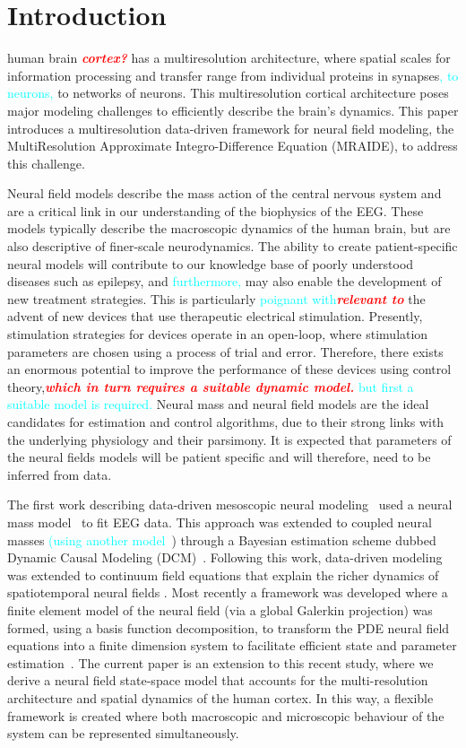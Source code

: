 \documentclass[journal]{IEEEtran}
\newcommand{\mike}[1]{\textsf{\emph{\textbf{\textcolor{red}{#1}}}}}
\newcommand{\cut}[1]{\textcolor{cyan}{#1}}
\begin{document}
\section{Introduction}
 human brain \mike{cortex?} has a multiresolution architecture, where spatial scales for information processing and transfer range from individual proteins in synapses\cut{, to neurons,} to networks of neurons. This multiresolution cortical architecture poses major modeling challenges to efficiently describe the brain's dynamics. This paper introduces a multiresolution data-driven framework for neural field modeling, the MultiResolution Approximate Integro-Difference Equation (MRAIDE), to address this challenge. 

Neural field models describe the mass action of the central nervous system and are a critical link in our understanding of the biophysics of the EEG. These models typically describe the macroscopic dynamics of the human brain, but are also descriptive of finer-scale neurodynamics. The ability to create patient-specific neural models will contribute to our knowledge base of poorly understood diseases such as epilepsy, and \cut{furthermore,} may also enable the development of new treatment strategies. This is particularly \cut{poignant with}\mike{relevant to} the advent of new devices that use therapeutic electrical stimulation. Presently, stimulation strategies for devices operate in an open-loop, where stimulation parameters are chosen using a process of trial and error. Therefore, there exists an enormous potential to improve the performance of these devices using control theory,\mike{which in turn requires a suitable dynamic model.}\cut{ but first a suitable model is required.} Neural mass and neural field models are the ideal candidates for estimation and control algorithms, due to their strong links with the underlying physiology and their parsimony. It is expected that parameters of the neural fields models will be patient specific and will therefore, need to be inferred from data.

The first work describing data-driven mesoscopic neural modeling~\cite{Valdes1999} used a neural mass model~\cite{LopesDaSilva1976,Zetterberg1978} to fit EEG data. This approach was extended to coupled neural masses \cut{(using another model~}\cite{Jansen1995}) through a Bayesian estimation scheme dubbed Dynamic Causal Modeling (DCM)~\cite{David2003}. Following this work, data-driven modeling was extended to continuum field equations that explain the richer dynamics of spatiotemporal neural fields \cite{Galka2008,schiff2008kalman,Daunizeau2009}. Most recently a framework was developed where a finite element model of the neural field (via a global Galerkin projection) was formed, using a basis function decomposition, to transform the PDE neural field equations into a finite dimension system to facilitate efficient state and parameter estimation~\cite{Freestone2011}. The current paper is an extension to this recent study, where we derive a neural field state-space model that accounts for the multi-resolution architecture and spatial dynamics of the human cortex. In this way, a flexible framework is created where both macroscopic and microscopic behaviour of the system can be represented simultaneously.
\end{document}
